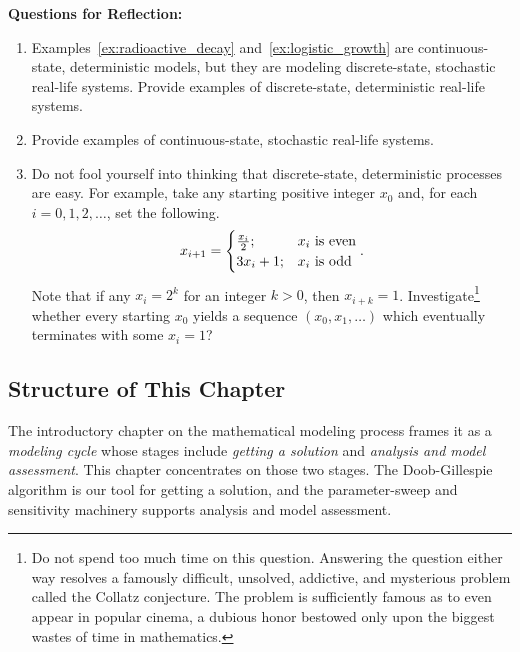 \noindent \textup{{\bf Questions for Reflection:}}
\begin{enumerate}
\item Examples~\ref{ex:radioactive_decay} and~\ref{ex:logistic_growth} are continuous-state, deterministic models, but they are modeling discrete-state, stochastic real-life systems. Provide examples of discrete-state, deterministic real-life systems.

\item Provide examples of continuous-state, stochastic real-life systems.

\item Do not fool yourself into thinking that discrete-state, deterministic processes are easy. For example, take any starting positive integer $x_0$ and, for each $i = 0, 1, 2, \ldots$, set the following.
\[x_{i+1} = \begin{cases}
\frac{x_i}{2};& x_i \textup{ is even} \\ 3x_i + 1;& x_i\textup{ is odd}
\end{cases}.\] Note that if any $x_i = 2^k$ for an integer $k > 0$, then $x_{i+k} = 1$. Investigate\footnote{Do not spend too much time on this question. Answering the question either way resolves a famously difficult, unsolved, addictive, and mysterious problem called the Collatz conjecture. The problem is sufficiently famous as to even appear in popular cinema, a dubious honor bestowed only upon the biggest wastes of time in mathematics.} whether every starting $x_0$ yields a sequence $(x_0, x_1, \ldots)$ which eventually terminates with some $x_i = 1$?
\end{enumerate}














\subsection{Structure of This Chapter}\label{subsec:structure}

The introductory chapter on the mathematical modeling process frames it as a \textit{modeling cycle} whose stages include \textit{getting a solution} and \textit{analysis and model assessment}. This chapter concentrates on those two stages. The Doob-Gillespie algorithm is our tool for getting a solution, and the parameter-sweep and sensitivity machinery supports analysis and model assessment.

